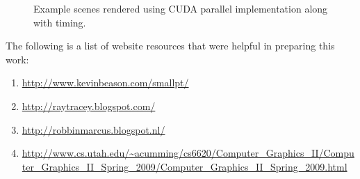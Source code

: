 \documentclass[12pt] {article}
\begin{document}
\begin{figure}[!tbh]
 \centering        
   \caption{Example scenes rendered using CUDA parallel implementation along with timing.}
   \label{fig:cuda}
\end{figure} 


The following is a list of website resources that were helpful in preparing this work:
\begin{enumerate}
\item \url{http://www.kevinbeason.com/smallpt/}
\item \url{http://raytracey.blogspot.com/}
\item \url{http://robbinmarcus.blogspot.nl/}
\item \url{http://www.cs.utah.edu/~acumming/cs6620/Computer_Graphics_II/Computer_Graphics_II_Spring_2009/Computer_Graphics_II_Spring_2009.html}
\end{enumerate}
\end{document}
